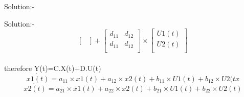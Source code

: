 \documentclass[journal,12pt,twocolumn]{IEEEtran}
\begin{document}
\begin{frame}{Solution:- }
\begin{frame}{Solution:- }
\[\begin{bmatrix}
\end{bmatrix}
+
\begin{bmatrix}
d_{11}&d_{12}\\
d_{11}&d_{12}\\
\end{bmatrix} \times\begin{bmatrix}
U1(t)\\
U2(t)\\
\end{bmatrix}
\]
\\therefore Y(t)=C.X(t)+D.U(t)
\begin{equation}
    \dot{x1(t)}=a_{11}\times x1(t)+a_{12}\times x2(t)+b_{11}\times U1(t)+b_{12}\times U2(tx
\end{equation}
\begin{equation}
    \dot{x2(t)}=a_{21}\times x1(t)+a_{22}\times x2(t)+b_{21}\times U1(t)+b_{22}\times U2(t)
\end{equation}


\end{frame}
\end{frame}
\end{document}
